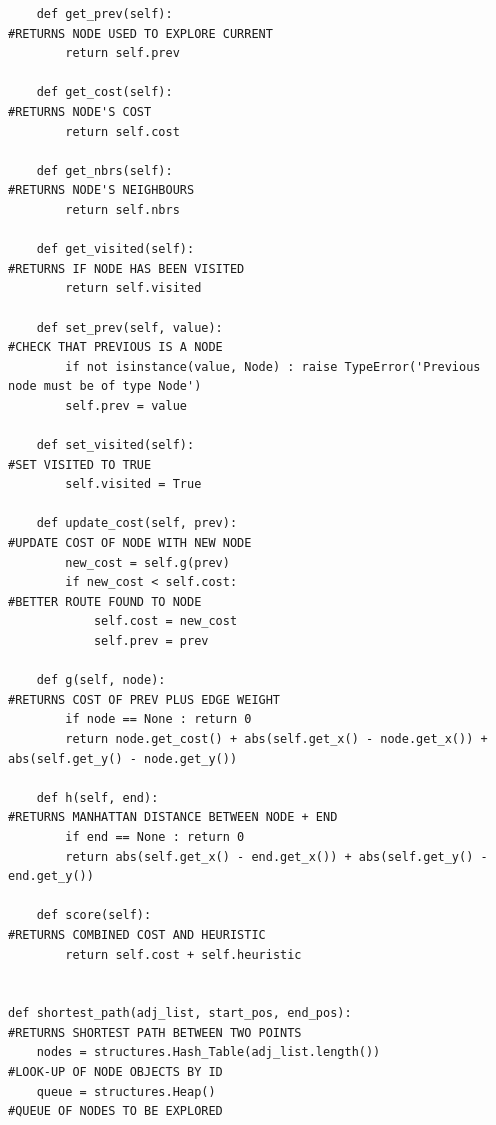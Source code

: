 \documentclass[titlepage]{article}
\begin{document}
\begin{changemargin}{-1in}{-1in}
\begin{verbatim}
    def get_prev(self):                                                         #RETURNS NODE USED TO EXPLORE CURRENT
        return self.prev

    def get_cost(self):                                                         #RETURNS NODE'S COST
        return self.cost

    def get_nbrs(self):                                                         #RETURNS NODE'S NEIGHBOURS
        return self.nbrs

    def get_visited(self):                                                      #RETURNS IF NODE HAS BEEN VISITED
        return self.visited

    def set_prev(self, value):                                                  #CHECK THAT PREVIOUS IS A NODE
        if not isinstance(value, Node) : raise TypeError('Previous node must be of type Node')
        self.prev = value

    def set_visited(self):                                                      #SET VISITED TO TRUE
        self.visited = True
    
    def update_cost(self, prev):                                                #UPDATE COST OF NODE WITH NEW NODE
        new_cost = self.g(prev)
        if new_cost < self.cost:                                                #BETTER ROUTE FOUND TO NODE
            self.cost = new_cost
            self.prev = prev

    def g(self, node):                                                          #RETURNS COST OF PREV PLUS EDGE WEIGHT
        if node == None : return 0
        return node.get_cost() + abs(self.get_x() - node.get_x()) + abs(self.get_y() - node.get_y())
        
    def h(self, end):                                                           #RETURNS MANHATTAN DISTANCE BETWEEN NODE + END
        if end == None : return 0
        return abs(self.get_x() - end.get_x()) + abs(self.get_y() - end.get_y())
        
    def score(self):                                                            #RETURNS COMBINED COST AND HEURISTIC
        return self.cost + self.heuristic


def shortest_path(adj_list, start_pos, end_pos):                                #RETURNS SHORTEST PATH BETWEEN TWO POINTS
    nodes = structures.Hash_Table(adj_list.length())                            #LOOK-UP OF NODE OBJECTS BY ID
    queue = structures.Heap()                                                   #QUEUE OF NODES TO BE EXPLORED
    

\end{verbatim}
\end{changemargin}
\end{document}
